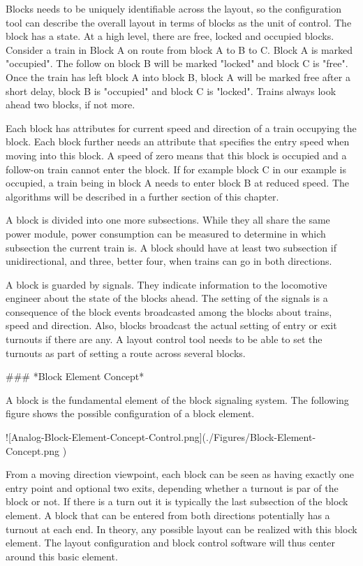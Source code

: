Blocks needs to be uniquely identifiable across the layout, so the configuration tool can describe the overall layout in terms of blocks as the unit of control. The block has a state. At a high level, there are free, locked and occupied blocks. Consider a train in Block A on route from block A to B to C. Block A is marked "occupied". The follow on block B will be marked "locked" and block C is "free". Once the train has left block A into block B, block A will be marked free after a short delay, block B is "occupied" and block C is "locked". Trains always look ahead two blocks, if not more.

Each block has attributes for current speed and direction of a train occupying the block. Each block further needs an attribute that specifies the entry speed when moving into this block. A speed of zero means that this block is occupied and a follow-on train cannot enter the block. If for example block C in our example is occupied, a train being in block A needs to enter block B at reduced speed. The algorithms will be described in a further section of this chapter.

A block is divided into one more subsections. While they all share the same power module, power consumption can be measured to determine in which subsection the current train is. A block should have at least two subsection if unidirectional, and three, better four, when trains can go in both directions.

A block is guarded by signals. They indicate information to the locomotive engineer about the state of the blocks ahead. The setting of the signals is a consequence of the block events broadcasted among the blocks about trains, speed and direction. Also, blocks broadcast the actual setting of entry or exit turnouts if there are any. A layout control tool needs to be able to set the turnouts as part of setting a route across several blocks.

### *Block Element Concept*

A block is the fundamental element of the block signaling system. The following figure shows the possible configuration of a block  element.

![Analog-Block-Element-Concept-Control.png](./Figures/Block-Element-Concept.png )

From a moving direction viewpoint, each block can be seen as having exactly one entry point and optional two exits, depending whether a turnout is par of the block or not. If there is a turn out it is typically the last subsection of the block element. A block that can be entered from both directions potentially has a turnout at each end. In theory, any possible layout can be realized with this block element. The layout configuration and block control software will thus center around this basic element.

